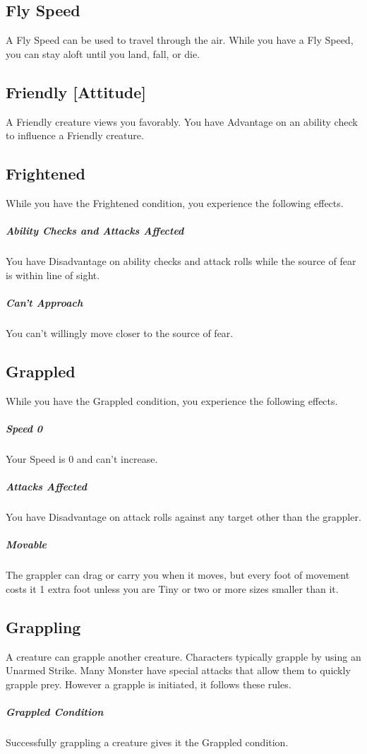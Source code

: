 \documentclass[10pt,a4paper,twoside,bg=print,twocolumn,openany,nodeprecatedcode]{dndarticle}
\begin{document}
\subsection{Fly Speed}
A Fly Speed can be used to travel through the air. While you have a Fly Speed, you can stay aloft until you land, fall, or die.

\subsection{Friendly [Attitude]}
A Friendly creature views you favorably. You have Advantage on an ability check to influence a Friendly creature.

\subsection{Frightened}
While you have the Frightened condition, you experience the following effects.

\subparagraph{Ability Checks and Attacks Affected}
You have Disadvantage on ability checks and attack rolls while the source of fear is within line of sight.

\subparagraph{Can't Approach}
You can't willingly move closer to the source of fear.

\subsection{Grappled}
While you have the Grappled condition, you experience the following effects.

\subparagraph{Speed 0}
Your Speed is 0 and can't increase.

\subparagraph{Attacks Affected}
You have Disadvantage on attack rolls against any target other than the grappler.

\subparagraph{Movable}
The grappler can drag or carry you when it moves, but every foot of movement costs it 1 extra foot unless you are Tiny or two or more sizes smaller than it.

\subsection{Grappling}
A creature can grapple another creature. Characters typically grapple by using an Unarmed Strike. Many Monster have special attacks that allow them to quickly grapple prey. However a grapple is initiated, it follows these rules.

\subparagraph{Grappled Condition}
Successfully grappling a creature gives it the Grappled condition.
\end{document}
